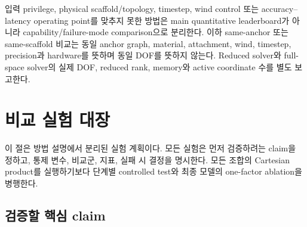 \documentclass[11pt,a4paper]{article}
\begin{document}
입력 privilege, physical scaffold/topology, timestep, wind control 또는
accuracy--latency operating point를 맞추지 못한 방법은
main quantitative leaderboard가 아니라 capability/failure-mode comparison으로 분리한다.
이하 same-anchor 또는 same-scaffold 비교는 동일 anchor graph, material, attachment,
wind, timestep, precision과 hardware를 뜻하며 동일 DOF를 뜻하지 않는다.
Reduced solver와 full-space solver의 실제 DOF, reduced rank, memory와 active coordinate 수를 별도 보고한다.

\clearpage
\section{비교 실험 대장}

이 절은 방법 설명에서 분리된 실험 계획이다.
모든 실험은 먼저 검증하려는 claim을 정하고,
통제 변수, 비교군, 지표, 실패 시 결정을 명시한다.
모든 조합의 Cartesian product를 실행하기보다
단계별 controlled test와 최종 모델의 one-factor ablation을 병행한다.

\subsection{검증할 핵심 claim}
\end{document}
